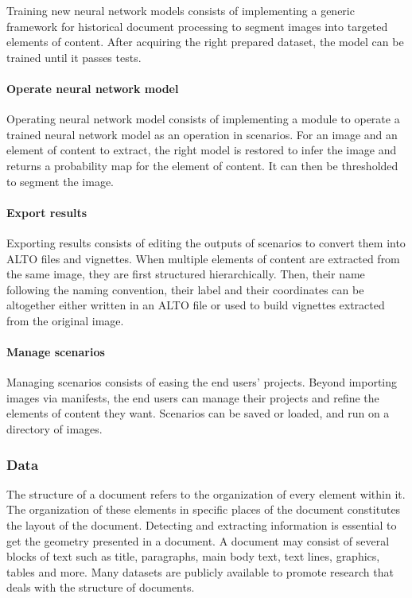 \documentclass{polytech/polytech}
\numberwithin{figure}{chapter}
\begin{document}
Training new neural network models consists of implementing a generic framework for historical document processing to segment images into targeted elements of content.
After acquiring the right prepared dataset, the model can be trained until it passes tests.

\paragraph{Operate neural network model}

Operating neural network model consists of implementing a module to operate a trained neural network model as an operation in scenarios.
For an image and an element of content to extract, the right model is restored to infer the image and returns a probability map for the element of content.
It can then be thresholded to segment the image.

\paragraph{Export results}

Exporting results consists of editing the outputs of scenarios to convert them into ALTO files and vignettes.
When multiple elements of content are extracted from the same image, they are first structured hierarchically.
Then, their name following the naming convention, their label and their coordinates can be altogether either written in an ALTO file or used to build vignettes extracted from the original image.

\paragraph{Manage scenarios}

Managing scenarios consists of easing the end users' projects.
Beyond importing images via manifests, the end users can manage their projects and refine the elements of content they want.
Scenarios can be saved or loaded, and run on a directory of images.


\subsubsection{Data}

The structure of a document refers to the organization of every element within it.
The organization of these elements in specific places of the document constitutes the layout of the document.
Detecting and extracting information is essential to get the geometry presented in a document.
A document may consist of several blocks of text such as title, paragraphs, main body text, text lines, graphics, tables and more.
Many datasets are publicly available to promote research that deals with the structure of documents.
\end{document}
